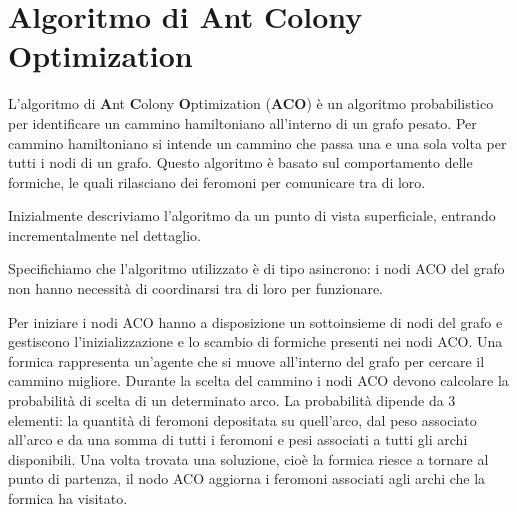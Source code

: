 \section{Algoritmo di Ant Colony Optimization}
L'algoritmo di \textbf{A}nt \textbf{C}olony \textbf{O}ptimization (\textbf{ACO}) è un algoritmo probabilistico 
per identificare un cammino hamiltoniano all'interno di un grafo pesato. Per cammino hamiltoniano si intende un cammino che passa una e una sola volta per tutti i nodi di un grafo.
Questo algoritmo è basato sul comportamento delle formiche, le quali rilasciano dei feromoni per comunicare tra di loro.

Inizialmente descriviamo l'algoritmo da un punto di vista superficiale, entrando incrementalmente nel dettaglio.

Specifichiamo che l'algoritmo utilizzato è di tipo asincrono: i nodi ACO del grafo non hanno necessità di coordinarsi tra di loro per funzionare.

Per iniziare i nodi ACO hanno a disposizione un sottoinsieme di nodi del grafo e gestiscono l'inizializzazione e lo scambio di formiche presenti nei nodi ACO.
Una formica rappresenta un'agente che si muove all'interno del grafo per cercare il cammino migliore. 
Durante la scelta del cammino i nodi ACO devono calcolare la probabilità di scelta di un determinato arco. La probabilità dipende da 3 elementi: la quantità di feromoni depositata su quell'arco, dal peso associato all'arco e da una somma di tutti i feromoni e pesi associati a tutti gli archi disponibili. 
Una volta trovata una soluzione, cioè la formica riesce a tornare al punto di partenza, il nodo ACO aggiorna i feromoni associati agli archi che la formica ha visitato.


